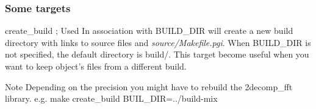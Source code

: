 \subsubsection*{Some targets}


\begin{DoxyItemize}
\item {\ttfamily create\-\_\-build} ; Used In association with B\-U\-I\-L\-D\-\_\-\-D\-I\-R will create a new build directory with links to source files and {\itshape source/\-Makefile.\-pgi}. When B\-U\-I\-L\-D\-\_\-\-D\-I\-R is not specified, the default directory is {\ttfamily build/}. This target become useful when you want to keep object's files from a different build.

\begin{DoxyNote}{Note}
Depending on the precision you might have to rebuild the {\ttfamily 2decomp\-\_\-fft} library. e.\-g. {\ttfamily make create\-\_\-build B\-U\-I\-L\-\_\-\-D\-I\-R=../build-\/mix}
\end{DoxyNote}


\end{DoxyItemize}
